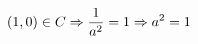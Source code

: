 \documentclass[preview]{standalone}
\begin{document}
\begin{align*}
\special{dvisvgm:raw <g id='unique000'>}(1,0) \in C \Rightarrow \frac{1}{a^2}=1 \Rightarrow a^2=1\special{dvisvgm:raw </g>}
\end{align*}
\end{document}
